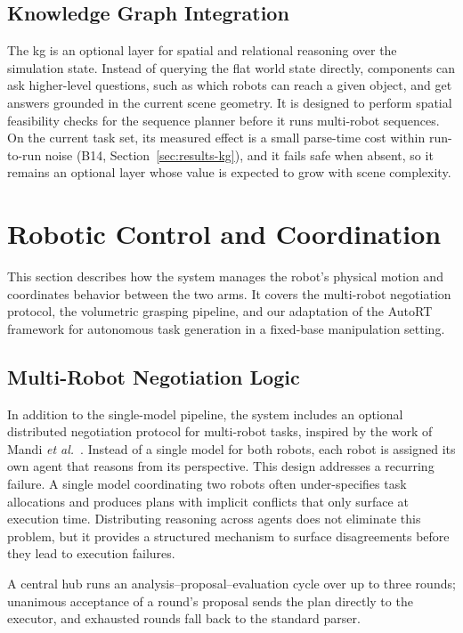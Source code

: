 \subsection{Knowledge Graph Integration}\label{sec:kg-integration}
The \gls{kg} is an optional layer for spatial and relational reasoning over the simulation state. Instead of querying the flat world state directly, components can ask higher-level questions, such as which robots can reach a given object, and get answers grounded in the current scene geometry. It is designed to perform spatial feasibility checks for the sequence planner before it runs multi-robot sequences. On the current task set, its measured effect is a small parse-time cost within run-to-run noise (B14, Section~\ref{sec:results-kg}), and it fails safe when absent, so it remains an optional layer whose value is expected to grow with scene complexity.

\section{Robotic Control and Coordination}
This section describes how the system manages the robot's physical motion and coordinates behavior between the two arms. It covers the multi-robot negotiation protocol, the volumetric grasping pipeline, and our adaptation of the AutoRT framework for autonomous task generation in a fixed-base manipulation setting.

\subsection{Multi-Robot Negotiation Logic}\label{sec:negotiation}
In addition to the single-model pipeline, the system includes an optional distributed negotiation protocol for multi-robot tasks, inspired by the work of Mandi \emph{et al.}~\cite{mandi2023rocodialecticmultirobotcollaboration}. Instead of a single model for both robots, each robot is assigned its own agent that reasons from its perspective. This design addresses a recurring failure. A single model coordinating two robots often under-specifies task allocations and produces plans with implicit conflicts that only surface at execution time. Distributing reasoning across agents does not eliminate this problem, but it provides a structured mechanism to surface disagreements before they lead to execution failures.

A central hub runs an analysis--proposal--evaluation cycle over up to three rounds; unanimous acceptance of a round's proposal sends the plan directly to the executor, and exhausted rounds fall back to the standard parser.

